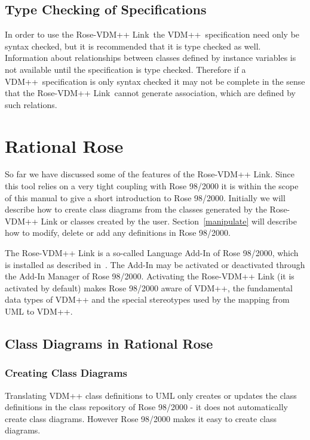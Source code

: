 \documentclass[\pformat,12pt]{article}
\newcommand{\vdmpp}{VDM++}
\newcommand{\link}{Rose-\vdmpp{} Link}
\newcommand{\rose}{Rose 98/2000}
\begin{document}
\subsection{Type Checking of Specifications}
\label{sec:typecheck}

In order to use the \link\ the \vdmpp\ specification need only be
syntax checked, but it is recommended that it is type checked as well.
Information about relationships between classes defined by instance
variables is not available until the specification is type checked.
Therefore if a \vdmpp\ specification is only syntax checked it may not
be complete in the sense that the \link\ cannot generate association,
which are defined by such relations.

\newpage  
\section{Rational Rose}
\label{rose98}
  
So far we have discussed some of the features of the \link{}. Since
this tool relies on a very tight coupling with \rose{} it is within
the scope of this manual to give a short introduction to \rose{}.
Initially we will describe how to create class diagrams from the
classes generated by the \link{} or classes created by the user.
Section~\ref{manipulate} will describe how to modify, delete or add
any definitions in \rose{}.  

The \link{} is a so-called Language Add-In of \rose{}, which is
installed as described in~\cite{InstallPPMan-SCSK}. The Add-In may be
activated or deactivated through the Add-In Manager of \rose{}.
Activating the \link{} (it is activated by default) makes \rose{}
aware of \vdmpp{}, the fundamental data types of \vdmpp{} and the
special stereotypes used by the mapping from UML to \vdmpp{}.

\subsection{Class Diagrams in Rational Rose}
\label{diagrams}
  
\subsubsection*{Creating Class Diagrams}

Translating \vdmpp{} class definitions to UML only creates or updates the class definitions   
in the class repository of \rose{} - it does not automatically create class diagrams. 
However \rose{} makes it easy to create class diagrams.
  
\end{document}
